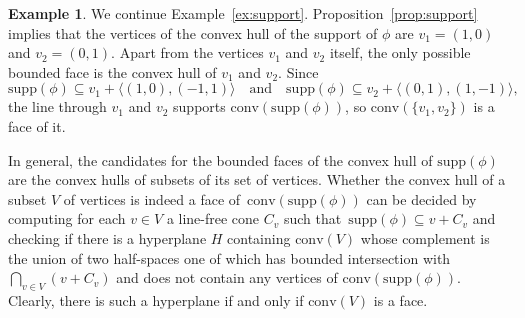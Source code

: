 \documentclass[a4paper,draft]{amsart}
\theoremstyle{definition}
\newtheorem{Example}{Example}
\begin{document}
\begin{Example}
We continue Example~\ref{ex:support}. Proposition~\ref{prop:support} implies that the vertices of the convex hull of the support of $\phi$ are $v_1 = (1,0)$ and $v_2 = (0,1)$. Apart from the vertices $v_1$ and $v_2$ itself, the only possible bounded face is the convex hull of $v_1$ and $v_2$. Since 
\begin{equation*}
\mathrm{supp}(\phi)\subseteq v_1 + \langle (1,0), (-1,1) \rangle \quad \text{and} \quad \mathrm{supp}(\phi) \subseteq v_2 + \langle (0,1), (1,-1) \rangle,  
\end{equation*}
the line through $v_1$ and $v_2$ supports $\mathrm{conv}(\mathrm{supp}(\phi))$, so $\mathrm{conv}(\{v_1,v_2\})$ is a face of it.
\end{Example}

In general, the candidates for the bounded faces of the convex hull of $\mathrm{supp}(\phi)$ are the convex hulls of subsets of its set of vertices. Whether the convex hull of a subset $V$ of vertices is indeed a face of~$\mathrm{conv}(\mathrm{supp}(\phi))$ can be decided by computing for each $v\in V$ a line-free cone $C_v$ such that~$\mathrm{supp}(\phi)\subseteq v + C_v$ and checking if there is a hyperplane $H$ containing $\mathrm{conv}(V)$ whose complement is the union of two half-spaces one of which has bounded intersection with $\bigcap_{v\in V} (v+C_v)$ and does not contain any vertices of $\mathrm{conv}(\mathrm{supp}(\phi))$. Clearly, there is such a hyperplane if and only if $\mathrm{conv}(V)$ is a face.\\ 
\end{document}
